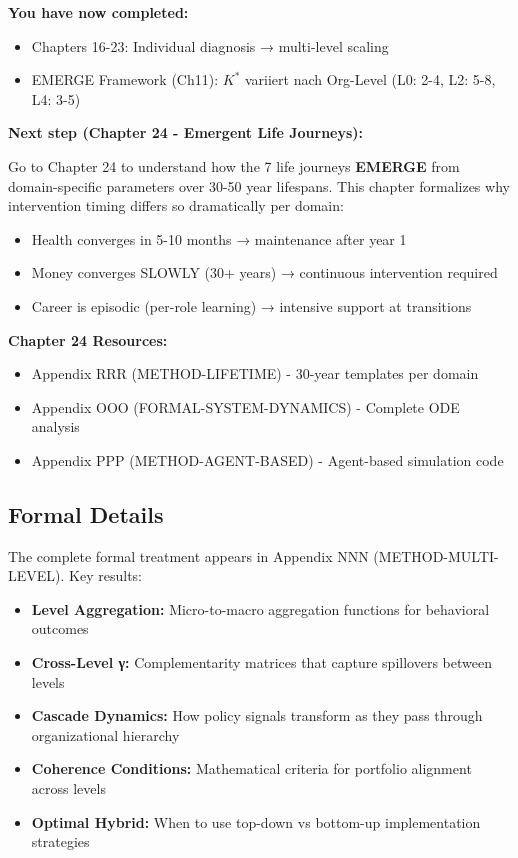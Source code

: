 \begin{tcolorbox}[colback=yellow!5!white, colframe=yellow!75!black, title=Reading Path: What Comes Next?]

\textbf{You have now completed:}
\begin{itemize}[nosep]
\item Chapters 16-23: Individual diagnosis → multi-level scaling
\item EMERGE Framework (Ch11): $K^*$ variiert nach Org-Level (L0: 2-4, L2: 5-8, L4: 3-5)
\end{itemize}

\textbf{Next step (Chapter 24 - Emergent Life Journeys):}

Go to Chapter 24 to understand how the 7 life journeys \textbf{EMERGE} from domain-specific parameters over 30-50 year lifespans. This chapter formalizes why intervention timing differs so dramatically per domain:
\begin{itemize}[nosep]
\item Health converges in 5-10 months → maintenance after year 1
\item Money converges SLOWLY (30+ years) → continuous intervention required
\item Career is episodic (per-role learning) → intensive support at transitions
\end{itemize}

\textbf{Chapter 24 Resources:}
\begin{itemize}[nosep]
\item Appendix RRR (METHOD-LIFETIME) - 30-year templates per domain
\item Appendix OOO (FORMAL-SYSTEM-DYNAMICS) - Complete ODE analysis
\item Appendix PPP (METHOD-AGENT-BASED) - Agent-based simulation code
\end{itemize}

\end{tcolorbox}

\subsection{Formal Details}
\label{sec:ch23-formal}

The complete formal treatment appears in Appendix NNN (METHOD-MULTI-LEVEL). Key results:

\begin{itemize}[nosep]
    \item \textbf{Level Aggregation:} Micro-to-macro aggregation functions for behavioral outcomes
    \item \textbf{Cross-Level γ:} Complementarity matrices that capture spillovers between levels
    \item \textbf{Cascade Dynamics:} How policy signals transform as they pass through organizational hierarchy
    \item \textbf{Coherence Conditions:} Mathematical criteria for portfolio alignment across levels
    \item \textbf{Optimal Hybrid:} When to use top-down vs bottom-up implementation strategies
\end{itemize}

